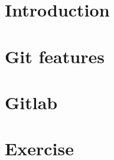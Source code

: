 \documentclass{IEECSlides}
\begin{document}




\section{Introduction}



\section{Git features}



\section{Gitlab}



\section{Exercise}


\end{document}
